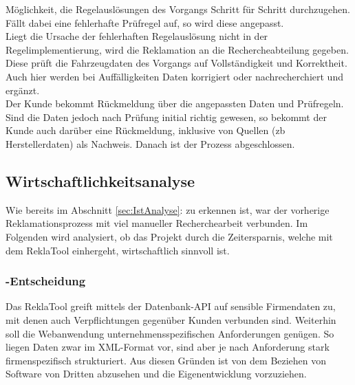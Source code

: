 Möglichkeit, die Regelauslösungen des Vorgangs Schritt für Schritt durchzugehen. Fällt dabei eine fehlerhafte Prüfregel auf, so wird diese angepasst.\\
Liegt die Ursache der fehlerhaften Regelauslösung nicht in der Regelimplementierung, wird die Reklamation an die Rechercheabteilung 
gegeben. Diese prüft die Fahrzeugdaten des Vorgangs auf Vollständigkeit und Korrektheit. Auch hier werden bei Auffälligkeiten Daten 
korrigiert oder nachrecherchiert und ergänzt.\\
Der Kunde bekommt Rückmeldung über die angepassten Daten und Prüfregeln. 
Sind die Daten jedoch nach Prüfung initial richtig gewesen, so bekommt der Kunde auch darüber eine Rückmeldung, 
inklusive von Quellen (\acs{zb} Herstellerdaten) als Nachweis.
Danach ist der Prozess abgeschlossen.


\subsection{Wirtschaftlichkeitsanalyse}
\label{sec:Wirtschaftlichkeitsanalyse}
Wie bereits im Abschnitt \ref{sec:IstAnalyse}:  zu erkennen ist, war der vorherige Reklamationsprozess
mit viel manueller Recherchearbeit verbunden. Im Folgenden wird analysiert, ob das Projekt durch die Zeitersparnis,
welche mit dem ReklaTool einhergeht, wirtschaftlich sinnvoll ist. 


\subsubsection{-Entscheidung}
\label{sec:MakeOrBuyEntscheidung}
Das ReklaTool greift mittels der Datenbank-\acs{API} auf sensible Firmendaten zu, mit denen auch Verpflichtungen 
gegenüber Kunden verbunden sind. Weiterhin soll die Webanwendung unternehmensspezifischen Anforderungen genügen.
So liegen Daten zwar im \acs{XML}-Format vor, sind aber je nach Anforderung stark firmenspezifisch strukturiert.
Aus diesen Gründen ist von dem Beziehen von Software von Dritten abzusehen und die Eigenentwicklung vorzuziehen.


